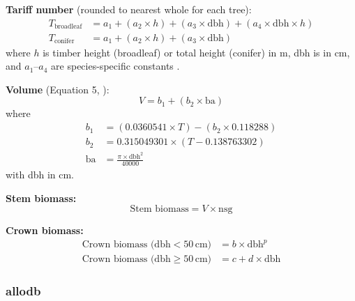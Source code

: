 \documentclass[12pt,a4paper]{article}
\begin{document}
\textbf{Tariff number} (rounded to nearest whole for each tree):
\begin{align}
  T_{\text{broadleaf}} &= a_1 + (a_2 \times h) + (a_3 \times \text{dbh}) + (a_4 \times \text{dbh} \times h) \label{eq:tariff-broadleaf} \\
  T_{\text{conifer}} &= a_1 + (a_2 \times h) + (a_3 \times \text{dbh}) \label{eq:tariff-conifer}
\end{align}
where $h$ is timber height (broadleaf) or total height (conifer) in m, dbh is in cm, and $a_1$--$a_4$ are species-specific constants \citep{Jenkins2018}.

\textbf{Volume} (Equation 5, \citealt{Jenkins2018}):
\begin{equation}
  V = b_1 + (b_2 \times \text{ba})
\end{equation}
where
\begin{align}
  b_1 &= (0.0360541 \times T) - (b_2 \times 0.118288) \nonumber \\
  b_2 &= 0.315049301 \times (T - 0.138763302) \nonumber \\
  \text{ba} &= \frac{\pi \times \text{dbh}^2}{40000}
\end{align}
with dbh in cm.

\textbf{Stem biomass:}
\begin{equation}
  \text{Stem biomass} = V \times \text{nsg}
\end{equation}

\textbf{Crown biomass:}
\begin{align}
  \text{Crown biomass (dbh} < 50\,\text{cm)} &= b \times \text{dbh}^p \\
  \text{Crown biomass (dbh} \geq 50\,\text{cm)} &= c + d \times \text{dbh}
\end{align}

\subsubsection{allodb}
\end{document}
